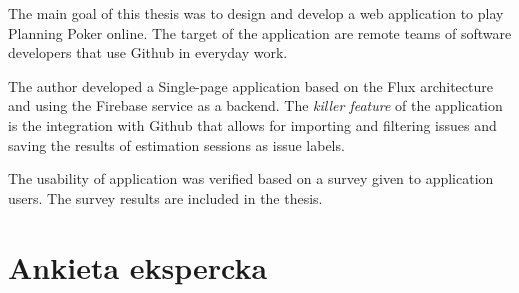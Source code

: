 \documentclass[inzynier,druk]{dyplom}
\begin{document}
The main goal of this thesis was to design and develop a web application to play
Planning Poker online. The target of the application are remote teams of software
developers that use Github in everyday work.

The author developed a Single-page application based on the Flux architecture
and using  the Firebase service as a backend.
The \textit{killer feature} of the application is the integration with
Github that allows for importing and filtering issues and saving the results of
estimation sessions as issue labels.

The usability of application was verified based on a survey given to
application users. The survey results are included in the thesis.
\endgroup
{}





















\appendixpage
\appendix

\chapter{Ankieta ekspercka}\label{Dod1}
\end{document}
